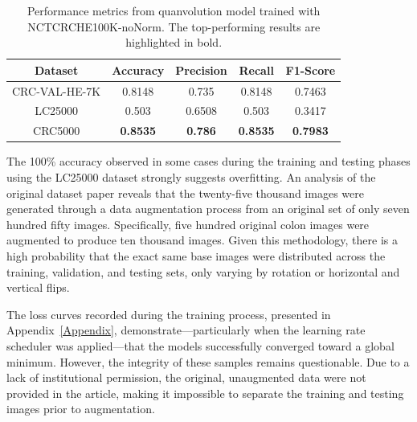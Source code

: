 \begin{table}[t!]
\centering

\caption{Performance metrics from quanvolution model trained with \gls{NCTCRCHE100K}-noNorm. The top-performing results are highlighted in bold.}
\label{table_quanvolution_nctcrche100k-nonorm}

\begin{tabular}{|c|c|c|c|c|}
\hline
\textbf{Dataset} & \textbf{Accuracy}          & \textbf{Precision}    & \textbf{Recall}       & \textbf{F1-Score}     \\ \hline
CRC-VAL-HE-7K                               & 0.8148                & 0.735                & 0.8148                 & 0.7463           \\ \hline
LC25000                               & 0.503                & 0.6508                & 0.503                & 0.3417           \\ \hline
CRC5000                          & \textbf{0.8535}                & \textbf{0.786}                & \textbf{0.8535}                & \textbf{0.7983}                \\ \hline
\end{tabular}

\end{table}



The 100\% accuracy observed in some cases during the training and testing phases using the \gls{LC25000} dataset strongly suggests overfitting. An analysis of the original dataset paper \cite{borkowski2019lungcoloncancerhistopathological} reveals that the twenty-five thousand images were generated through a data augmentation process from an original set of only seven hundred fifty images. Specifically, five hundred original colon images were augmented to produce ten thousand images. Given this methodology, there is a high probability that the exact same base images were distributed across the training, validation, and testing sets, only varying by rotation or horizontal and vertical flips.

The loss curves recorded during the training process, presented in Appendix~\ref{Appendix}, demonstrate—particularly when the learning rate scheduler was applied—that the models successfully converged toward a global minimum. However, the integrity of these samples remains questionable. Due to a lack of institutional permission, the original, unaugmented data were not provided in the article, making it impossible to separate the training and testing images prior to augmentation.

